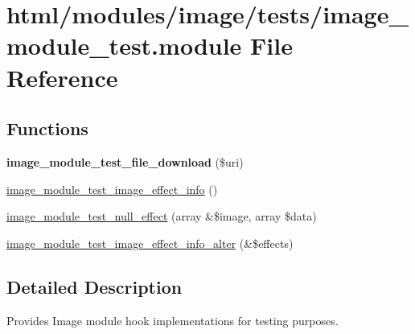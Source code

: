 \hypertarget{image__module__test_8module}{
\section{html/modules/image/tests/image\_\-module\_\-test.module File Reference}
\label{image__module__test_8module}
}
\subsection*{Functions}
\begin{DoxyCompactItemize}
\item 
\hypertarget{image__module__test_8module_aa776ccf6effbdde39ea43ee557004ee8}{
{\bfseries image\_\-module\_\-test\_\-file\_\-download} (\$uri)}
\label{image__module__test_8module_aa776ccf6effbdde39ea43ee557004ee8}

\item 
\hyperlink{image__module__test_8module_a666de4b9a3cc56458e14647046e7604d}{image\_\-module\_\-test\_\-image\_\-effect\_\-info} ()
\item 
\hyperlink{image__module__test_8module_a1a0a065dcba8f1dd346104282fb29fea}{image\_\-module\_\-test\_\-null\_\-effect} (array \&\$image, array \$data)
\item 
\hyperlink{image__module__test_8module_ae67c8b32aaeaf1c75c0985a83bef3165}{image\_\-module\_\-test\_\-image\_\-effect\_\-info\_\-alter} (\&\$effects)
\end{DoxyCompactItemize}


\subsection{Detailed Description}
Provides Image module hook implementations for testing purposes. 

